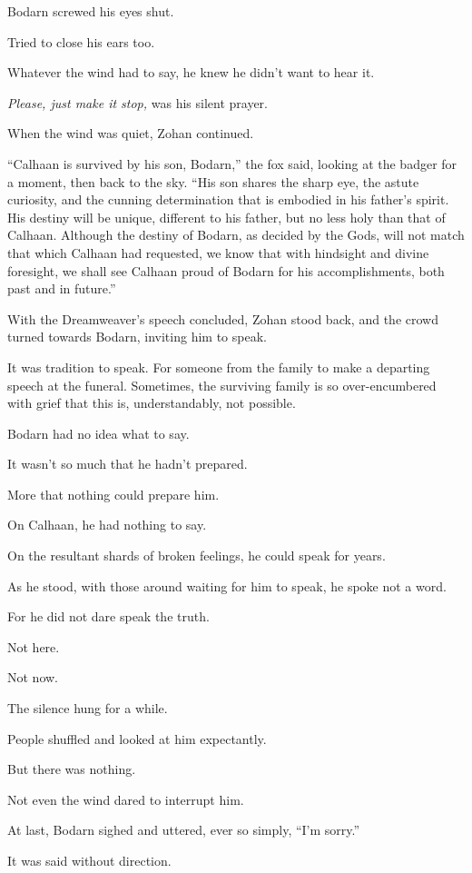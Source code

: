 Bodarn screwed his eyes shut.

Tried to close his ears too.

Whatever the wind had to say, he knew he didn't want to hear it.

\emph{Please, just make it stop,} was his silent prayer.

When the wind was quiet, Zohan continued.

``Calhaan is survived by his son, Bodarn,'' the fox said, looking at the badger for a moment, then back to the sky. ``His son shares the sharp eye, the astute curiosity, and the cunning determination that is embodied in his father's spirit. His destiny will be unique, different to his father, but no less holy than that of Calhaan. Although the destiny of Bodarn, as decided by the Gods, will not match that which Calhaan had requested, we know that with hindsight and divine foresight, we shall see Calhaan proud of Bodarn for his accomplishments, both past and in future.''

With the Dreamweaver's speech concluded, Zohan stood back, and the crowd turned towards Bodarn, inviting him to speak.

It was tradition to speak. For someone from the family to make a departing speech at the funeral. Sometimes, the surviving family is so over-encumbered with grief that this is, understandably, not possible.

Bodarn had no idea what to say.

It wasn't so much that he hadn't prepared.

More that nothing could prepare him.

On Calhaan, he had nothing to say.

On the resultant shards of broken feelings, he could speak for years.

As he stood, with those around waiting for him to speak, he spoke not a word.

For he did not dare speak the truth.

Not here.

Not now.

The silence hung for a while.

People shuffled and looked at him expectantly.

But there was nothing.

Not even the wind dared to interrupt him.

At last, Bodarn sighed and uttered, ever so simply, ``I'm sorry.''

It was said without direction.

